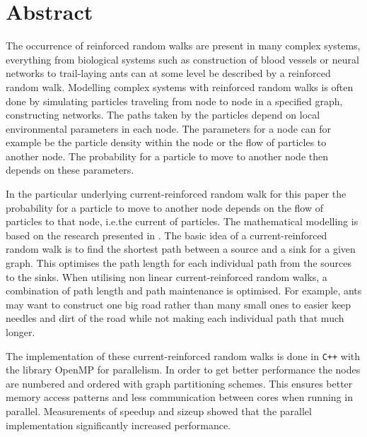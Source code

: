 \section*{Abstract}
\label{sec:abstract}

The occurrence of reinforced random walks are present in many complex systems, everything from biological systems such as construction of blood vessels or neural networks to trail-laying ants can at some level be described by a reinforced random walk. Modelling complex systems with reinforced random walks is often done by simulating particles traveling from node to node in a specified graph, constructing networks. The paths taken by the particles depend on local environmental parameters in each node. The parameters for a node can for example be the particle density within the node or the flow of particles to another node. The probability for a particle to move to another node then depends on these parameters.

In the particular underlying current-reinforced random walk for this paper the probability for a particle to move to another node depends on the flow of particles to that node, i.e.\@ the current of particles. The mathematical modelling is based on the research presented in \cite{Sumpter}. The basic idea of a current-reinforced random walk is to find the shortest path between a source and a sink for a given graph. This optimises the path length for each individual path from the sources to the sinks. When utilising non linear current-reinforced random walks, a combination of path length and path maintenance is optimised. For example, ants may want to construct one big road rather than many small ones to easier keep needles and dirt of the road while not making each individual path that much longer.

The implementation of these current-reinforced random walks is done in \texttt{C++} with the library OpenMP for parallelism. In order to get better performance the nodes are numbered and ordered with graph partitioning schemes. This ensures better memory access patterns and less communication between cores when running in parallel. Measurements of speedup and sizeup showed that the parallel implementation significantly increased performance. 